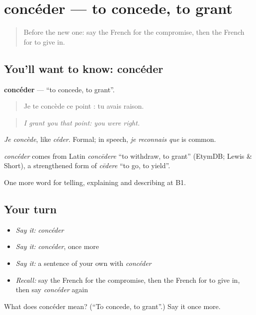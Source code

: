 \section[concéder]{concéder — to concede, to grant}

\label{lesson:FR-C337-conceder}



\begin{quote}
Before the new one: say the French for the compromise, then the French for to give in.
\end{quote}

\subsection*{You'll want to know: concéder}
\textbf{concéder} — \textquotedblleft{}to concede, to grant\textquotedblright{}.

\begin{quote}
Je te concède ce point : tu avais raison.
\end{quote}

\begin{quote}
\emph{I grant you that point: you were right.}
\end{quote}

\emph{Je concède}, like \emph{céder}. Formal; in speech, \emph{je reconnais que} is common.

\begin{cousinweb}
\emph{concéder} comes from Latin \emph{concēdere} \textquotedblleft{}to withdraw, to grant\textquotedblright{} (EtymDB; Lewis \& Short), a strengthened form of \emph{cēdere} \textquotedblleft{}to go, to yield\textquotedblright{}.
\end{cousinweb}

\begin{grammarlens}[title={What you've built}]
One more word for telling, explaining and describing at B1.
\end{grammarlens}

\subsection*{Your turn}
\begin{itemize}
\raggedright
  \item \emph{Say it:} \emph{concéder}
  \item \emph{Say it:} \emph{concéder}, once more
  \item \emph{Say it:} a sentence of your own with \emph{concéder}
  \item \emph{Recall:} say the French for the compromise, then the French for to give in, then say \emph{concéder} again
\end{itemize}

\begin{tcolorbox}[breakable,colback=teal!4,colframe=teal!35!black,title={Before you move on}]
What does concéder mean? (\textquotedblleft{}To concede, to grant\textquotedblright{}.) Say it once more.
\end{tcolorbox}
